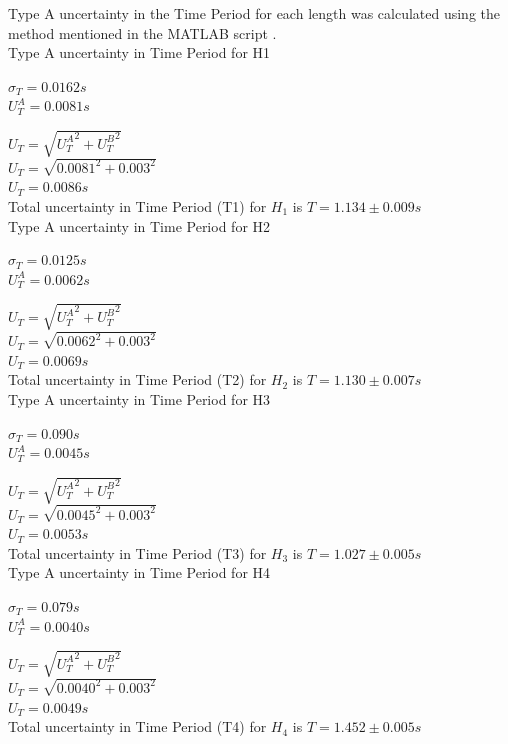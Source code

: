 Type A uncertainty in the Time Period for each length was calculated using the method mentioned in the MATLAB script . \\
Type A uncertainty in Time Period for H1
\begin{center}
$\sigma_T = 0.0162 s$ \\
$ U_T^A =  0.0081s$ \\
\end{center}
$ U_T = \sqrt{{U_T^A}^2 +{U_T^B}^2}$ \\
$ U_T = \sqrt{0.0081^2+0.003^2}$ \\
$ U_T = 0.0086s $ \\
Total uncertainty in Time Period (T1)  for $H_1$ is $ T = 1.134 \pm 0.009 s$\\
Type A uncertainty in Time Period for H2
\begin{center}
$\sigma_T = 0.0125 s$ \\
$ U_T^A =  0.0062s$ \\
\end{center}
$ U_T = \sqrt{{U_T^A}^2 +{U_T^B}^2}$ \\
$ U_T = \sqrt{0.0062^2+0.003^2}$ \\
$ U_T = 0.0069s $ \\
Total uncertainty in Time Period (T2)  for $H_2$ is $ T = 1.130 \pm 0.007 s$\\
Type A uncertainty in Time Period for H3
\begin{center}
$\sigma_T = 0.090 s$ \\
$ U_T^A =  0.0045s$ \\
\end{center}
$ U_T = \sqrt{{U_T^A}^2 +{U_T^B}^2}$ \\
$ U_T = \sqrt{0.0045^2+0.003^2}$ \\
$ U_T = 0.0053s $ \\
Total uncertainty in Time Period (T3) for $H_3$ is $ T = 1.027 \pm 0.005 s$\\
Type A uncertainty in Time Period for H4
\begin{center}
$\sigma_T = 0.079 s$ \\
$ U_T^A =  0.0040s$ \\
\end{center}
$ U_T = \sqrt{{U_T^A}^2 +{U_T^B}^2}$ \\
$ U_T = \sqrt{0.0040^2+0.003^2}$ \\
$ U_T = 0.0049s $ \\
Total uncertainty in Time Period (T4)  for $H_4$ is $ T = 1.452 \pm 0.005 s$
    
